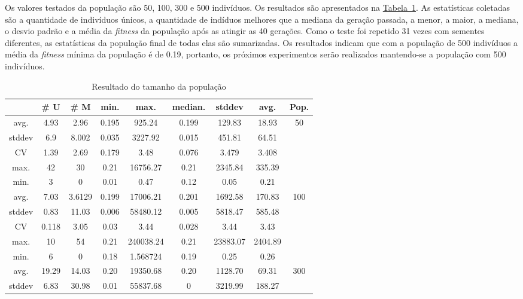 \documentclass[a4paper]{paper}
\begin{document}
Os valores testados da população são 50, 100, 300 e 500 indivíduos. Os resultados
são apresentados na \hyperref[tbl:result_pop]{Tabela~\ref*{tbl:result_pop}}.
As estatísticas coletadas são a quantidade de indivíduos únicos, a quantidade de
indíduos melhores que a mediana da geração passada, a menor, a maior, a mediana,
o desvio padrão e a média da \textit{fitness} da população após as atingir as
40 gerações. Como o teste foi repetido 31 vezes com sementes diferentes, as
estatísticas da população final de todas elas são sumarizadas. Os resultados
indicam que com a população de 500 indivíduos a média da \textit{fitness} mínima
da população é de 0.19, portanto, os próximos experimentos serão realizados
mantendo-se a população com 500 indivíduos.

\noindent
\begin{table}[h!]
  \center
  \caption{Resultado do tamanho da população}
  \label{tbl:result_pop}
  \begin{tabular}{| c | c | c | c | c | c | c | c | c |}
    \hline
    &  \# U & \# M & min. & max. & median. & stddev & avg. & Pop. \\ \hline \hline
    avg. & 4.93 & 2.96 & 0.195 & 925.24 & 0.199 & 129.83 & 18.93 &  \multirow{5}{1.5cm}{50} \\ \cline{1-8}
    stddev & 6.9 & 8.002 & 0.035 & 3227.92 & 0.015 & 451.81 & 64.51 & \\ \cline{1-8}
    CV & 1.39 & 2.69 & 0.179 & 3.48 & 0.076 & 3.479 & 3.408 & \\ \cline{1-8}
    max. & 42 & 30 & 0.21 & 16756.27 & 0.21 & 2345.84 & 335.39 & \\ \cline{1-8}
    min. & 3 & 0 & 0.01 & 0.47 & 0.12 & 0.05 & 0.21 & \\ \hline \hline
    avg. & 7.03 & 3.6129 & 0.199 & 17006.21 & 0.201 & 1692.58 & 170.83 & \multirow{5}{1.5cm}{100} \\ \cline{1-8}
    stddev & 0.83 & 11.03 & 0.006 & 58480.12 & 0.005 & 5818.47 & 585.48 & \\ \cline{1-8}
    CV & 0.118 & 3.05 & 0.03 & 3.44 & 0.028 & 3.44 & 3.43 & \\ \cline{1-8}
    max. & 10 & 54 & 0.21 & 240038.24 & 0.21 & 23883.07 & 2404.89  & \\ \cline{1-8}
    min. & 6 & 0 & 0.18 & 1.568724 & 0.19 & 0.25 & 0.26 & \\ \hline \hline
    avg. & 19.29 & 14.03 & 0.20 & 19350.68 & 0.20 & 1128.70 & 69.31 & \multirow{5}{1.5cm}{300} \\ \cline{1-8}
    stddev & 6.83 & 30.98 & 0.01 & 55837.68 & 0 & 3219.99 & 188.27 & \\ \cline{1-8}

\end{tabular}
\end{table}
\end{document}
